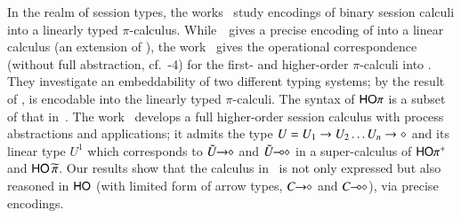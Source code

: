 In the realm of session types, the works~\cite{DemangeonH11,Dardha:2012:STR:2370776.2370794} 
study encodings of binary session calculi into a linearly typed $\pi$-calculus. 
While~\cite{DemangeonH11}~gives a precise encoding of \sessp into a linear calculus 
(an extension of \cite{BHY}),  
the work~\cite{Dardha:2012:STR:2370776.2370794} 
gives the operational correspondence 
(without full abstraction, cf.~-4)
for the first- and higher-order 
$\pi$-calculi into \cite{LinearPi}. 
They investigate an embeddability of two different typing systems;
by the result of \cite{DemangeonH11}, 
\HOpp is encodable  into the linearly typed $\pi$-calculi.     
The syntax of $\mathsf{HO}\pi$ is a subset of that in~\cite{tlca07,MostrousY15}.
The work~\cite{tlca07} develops a full higher-order session calculus
with process abstractions and applications; it admits the type 
$U=U_1 \rightarrow U_2 \dots U_n \rightarrow \diamond$ and its linear type 
$U^1$
which corresponds to $\tilde{U}\!\! \rightarrow\!\! \diamond$ and $\tilde{U}\!\! \multimap\!\! \diamond$ in 
a super-calculus of $\mathsf{HO\pi^{+}}$ and $\mathsf{HO}\,{\widetilde{\pi}}$. 
Our results show that
the calculus in~\cite{tlca07} is not only expressed but 
also reasoned in 
$\mathsf{HO}$ (with limited form of arrow types, $C\!\! \rightarrow\!\! \diamond$ and $C\!\! \multimap\!\! \diamond$), via precise encodings. 





